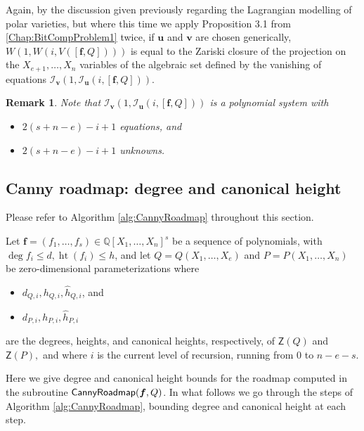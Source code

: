 \documentclass[12pt]{article}
\DeclareMathOperator{\htt}{ht}
\def\Q{\mathbb{Q}}
\newtheorem{remark}[theorem]{Remark}
\def\Zeroes{\mathsf{Z}}
\def\CannyRoadmapL{{\sf CannyRoadmap}}
\def\Q{\mathbb{Q}}
\begin{document}
Again, by the discussion given previously  regarding the Lagrangian modelling of polar varieties, but where this time we apply Proposition 3.1 from \ref{Chap:BitCompProblem1} twice, if $\bm u$ and $\bm v$ are chosen generically, $W(1,W(i,V([\bm f,Q])))$ is equal to the Zariski closure of the projection on the $X_{e+1},\hdots,X_{n}$ variables of the algebraic set defined by the vanishing of equations $\mathscr{I}_{\bm v}(1,\mathscr{I}_{\bm u}(i,[\bm f,Q])).$ 
%
\begin{remark}
    Note that $\mathscr{I}_{\bm v}(1,\mathscr{I}_{\bm u}(i,[\bm f,Q]))$ is a polynomial system with
    \begin{itemize}
        \item $2(s+n-e)-i+1$ equations, and
        \item $2(s+n-e)-i+1$ unknowns. 
    \end{itemize}
\end{remark}
%











\subsection{Canny roadmap: degree and canonical height}
Please refer to Algorithm \ref{alg:CannyRoadmap} throughout this section. 


Let $\bm f = (f_1,\hdots,f_s) \in \Q[X_1,\hdots,X_n]^s$ be a sequence of polynomials, with $\deg f_i \leq d,\htt(f_i) \leq h$, and let $Q = Q(X_1,\hdots,X_e)$ and $P = P(X_1,\hdots,X_n)$ be zero-dimensional parameterizations where
\begin{itemize}
    \item $d_{Q,i}, h_{Q,i},\hat{h}_{Q,i}$, and
    \item $d_{P,i}, h_{P,i},\hat{h}_{P,i}$
\end{itemize}
are the degrees, heights, and canonical heights, respectively, of $\Zeroes(Q)$ and $\Zeroes(P),$ and
where $i$ is the current level of recursion, running from $0$ to $n-e-s$. 


Here we give degree and canonical height bounds for the roadmap computed in the subroutine $\CannyRoadmapL(\bm f, Q)$. In what follows we go through the steps of Algorithm \ref{alg:CannyRoadmap}, bounding degree and canonical height at each step.
\end{document}
